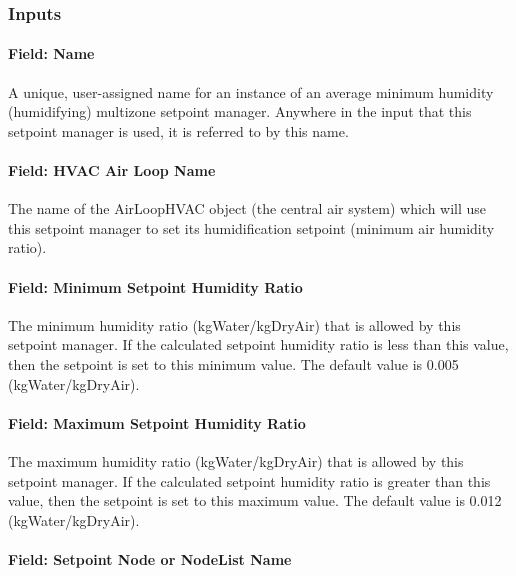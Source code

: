 \subsubsection{Inputs}\label{inputs-16-009}

\paragraph{Field: Name}\label{field-name-16-008}

A unique, user-assigned name for an instance of an average minimum humidity (humidifying) multizone setpoint manager. Anywhere in the input that this setpoint manager is used, it is referred to by this name.

\paragraph{Field: HVAC Air Loop Name}\label{field-hvac-air-loop-name-6}

The name of the AirLoopHVAC object (the central air system) which will use this setpoint manager to set its humidification setpoint (minimum air humidity ratio).

\paragraph{Field: Minimum Setpoint Humidity Ratio}\label{field-minimum-setpoint-humidity-ratio-1}

The minimum humidity ratio (kgWater/kgDryAir) that is allowed by this setpoint manager. If the calculated setpoint humidity ratio is less than this value, then the setpoint is set to this minimum value. The default value is 0.005 (kgWater/kgDryAir).

\paragraph{Field: Maximum Setpoint Humidity Ratio}\label{field-maximum-setpoint-humidity-ratio-1}

The maximum humidity ratio (kgWater/kgDryAir) that is allowed by this setpoint manager. If the calculated setpoint humidity ratio is greater than this value, then the setpoint is set to this maximum value. The default value is 0.012 (kgWater/kgDryAir).

\paragraph{Field: Setpoint Node or NodeList Name}\label{field-setpoint-node-or-nodelist-name-15}

